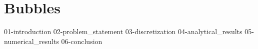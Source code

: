\chapter{\label{ch:bubbles}Bubbles}

{01-introduction}
{02-problem_statement}
{03-discretization}
{04-analytical_results}
{05-numerical_results}
{06-conclusion}

